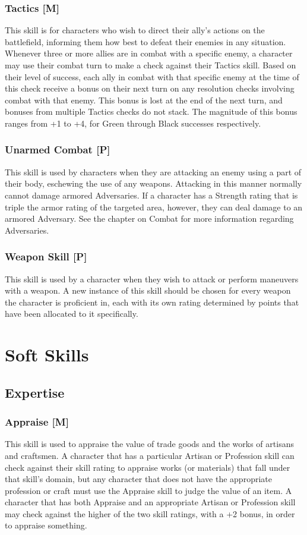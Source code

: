 \documentclass[oneside]{book}
\begin{document}
\begin{multicols}{2}
\subsubsection{Tactics [M]}
This skill is for characters who wish to direct their ally's actions on the battlefield, informing them how best to defeat their enemies in any situation. Whenever three or more allies are in combat with a specific enemy, a character may use their combat turn to make a check against their Tactics skill. Based on their level of success, each ally in combat with that specific enemy at the time of this check receive a bonus on their next turn on any resolution checks involving combat with that enemy. This bonus is lost at the end of the next turn, and bonuses from multiple Tactics checks do not stack. The magnitude of this bonus ranges from +1 to +4, for Green through Black successes respectively. 

\subsubsection{Unarmed Combat [P]}
This skill is used by characters when they are attacking an enemy using a part of their body, eschewing the use of any weapons. Attacking in this manner normally cannot damage armored Adversaries. If a character has a Strength rating that is triple the armor rating of the targeted area, however, they can deal damage to an armored Adversary. See the chapter on Combat for more information regarding Adversaries. 

\subsubsection{Weapon Skill [P]}
This skill is used by a character when they wish to attack or perform maneuvers with a weapon. A new instance of this skill should be chosen for every weapon the character is proficient in, each with its own rating determined by points that have been allocated to it specifically.

\section{Soft Skills}
\subsection{Expertise}
\subsubsection{Appraise [M]}
This skill is used to appraise the value of trade goods and the works of artisans and craftsmen. A character that has a particular Artisan or Profession skill can check against their skill rating to appraise works (or materials) that fall under that skill's domain, but any character that does not have the appropriate profession or craft must use the Appraise skill to judge the value of an item. A character that has both Appraise and an appropriate Artisan or Profession skill may check against the higher of the two skill ratings, with a +2 bonus, in order to appraise something. 


\end{multicols}
\end{document}
